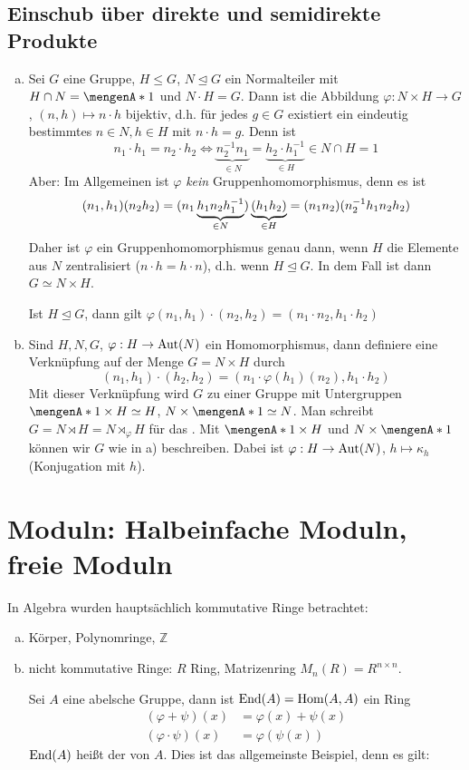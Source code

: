 \subsection{Einschub über direkte und semidirekte Produkte} %
\label{sub:129}
\begin{enumerate}[a)]
	\item Sei $G$ eine Gruppe, $H \le G$, $N \unlhd G$ ein Normalteiler mit $H \cap N = \set{1}$ und $N \cdot H = G$. Dann ist die Abbildung $\varphi : N \times H \to G$,
	$(n,h) \mapsto n \cdot h$ bijektiv, d.h. für jedes $g \in G$ existiert ein eindeutig bestimmtes $n \in N, h \in H$ mit $n \cdot h = g$.
	Denn ist 
	\[
		n_1 \cdot h_1 = n_2 \cdot h_2 \iff \underbrace{n_2 ^{-1} n_1}_{\in N} = \underbrace{h_2 \cdot h_1 ^{-1}}_{\in H} \in N \cap H = 1
	\]
	Aber: Im Allgemeinen ist $\varphi$ \emph{kein} Gruppenhomomorphismus, denn es ist 
	\[
		(n_1, h_1) (n_2 h_2) = (n_1 \underbrace{h_1 n_2 h_1 ^{-1}}_{\in N}) \underbrace{(h_1 h_2)}_{\in H} = (n_1 n_2) (n_2 ^{-1} h_1 n_2 h_2)
	\]
	Daher ist $\varphi$ ein Gruppenhomomorphismus genau dann, wenn $H$ die Elemente aus $N$ zentralisiert ($n \cdot h = h \cdot n$),
	 d.h. wenn $H\unlhd G$. In dem Fall ist dann $G\simeq N \times H$. 
	
	Ist $H \unlhd G$, dann gilt $\varphi(n_1, h_1) \cdot (n_2, h_2) = (n_1 \cdot n_2, h_1 \cdot h_2)$
	\item Sind $H,N, G$, $\varphi : H \to \operatorname{Aut}(N)$ ein Homomorphismus, dann definiere eine Verknüpfung auf der Menge $G = N \times H$ durch
	\[
		(n_1, h_1) \cdot (h_2, h_2) = (n_1 \cdot \varphi(h_1) (n_2), h_1 \cdot h_2)
	\]
	Mit dieser Verknüpfung wird $G$ zu einer Gruppe mit Untergruppen $\set{1} \times H \simeq H $, $N \times \set{1} \simeq N $. Man schreibt 
	$G = N \rtimes H = N \rtimes_\varphi H$ für das . Mit $\set{1} \times H $ und $N \times \set{1} $ können wir $G$ 
	wie in a) beschreiben. Dabei ist $\varphi : H \to \operatorname{Aut}(N)$, $h \mapsto \kappa_h$ (Konjugation mit $h$).
\end{enumerate}
\newpage

\section{Moduln: Halbeinfache Moduln, freie Moduln} %
\label{sec:2}

In Algebra  wurden hauptsächlich kommutative Ringe betrachtet:
\begin{enumerate}[a)]
	\item Körper, Polynomringe, $\mathds{Z}$
	\item nicht kommutative Ringe: $R$ Ring, Matrizenring $M_n(R)= R^{n \times n}$. 
	
	Sei $A$ eine abelsche Gruppe, dann ist $\operatorname{End}(A) = \operatorname{Hom}(A,A)$ ein Ring 
	\begin{align*}
		(\varphi + \psi)(x) &= \varphi(x) + \psi(x) \\
		(\varphi \cdot \psi)(x) &= \varphi(\psi(x))
	\end{align*}
	$\operatorname{End}(A)$ heißt der  von $A$. Dies ist das allgemeinste Beispiel, denn es gilt:
\end{enumerate}

